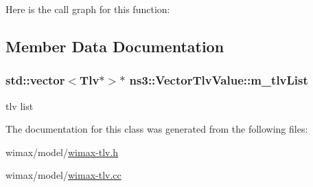 Here is the call graph for this function\+:




\subsection{Member Data Documentation}
\subsubsection[{\texorpdfstring{m\+\_\+tlv\+List}{m_tlvList}}]{\setlength{\rightskip}{0pt plus 5cm}std\+::vector$<${\bf Tlv}$\ast$$>$$\ast$ ns3\+::\+Vector\+Tlv\+Value\+::m\+\_\+tlv\+List\hspace{0.3cm}{\ttfamily [private]}}\hypertarget{classns3_1_1VectorTlvValue_ad49d4f89485ab15535336e8cea6bd20c}{}\label{classns3_1_1VectorTlvValue_ad49d4f89485ab15535336e8cea6bd20c}


tlv list 



The documentation for this class was generated from the following files\+:\begin{DoxyCompactItemize}
\item 
wimax/model/\hyperlink{wimax-tlv_8h}{wimax-\/tlv.\+h}\item 
wimax/model/\hyperlink{wimax-tlv_8cc}{wimax-\/tlv.\+cc}\end{DoxyCompactItemize}
